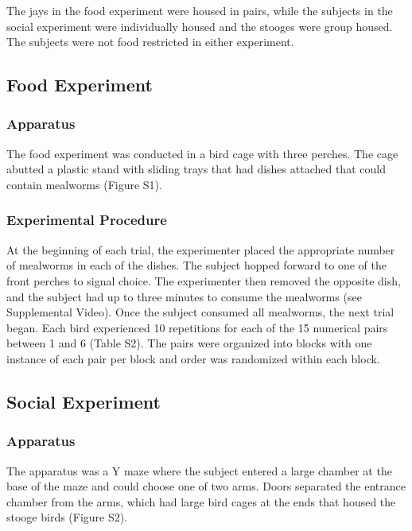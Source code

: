 \documentclass[
  ,pub,floatsintext]{apa6}
\begin{document}
The jays in the food experiment were housed in pairs, while the subjects in the social experiment were individually housed and the stooges were group housed. The subjects were not food restricted in either experiment.

\hypertarget{food-experiment}{%
\subsection{Food Experiment}\label{food-experiment}}

\hypertarget{apparatus}{%
\subsubsection{Apparatus}\label{apparatus}}

The food experiment was conducted in a bird cage with three perches. The cage abutted a plastic stand with sliding trays that had dishes attached that could contain mealworms (Figure S1).

\hypertarget{experimental-procedure}{%
\subsubsection{Experimental Procedure}\label{experimental-procedure}}

At the beginning of each trial, the experimenter placed the appropriate number of mealworms in each of the dishes. The subject hopped forward to one of the front perches to signal choice. The experimenter then removed the opposite dish, and the subject had up to three minutes to consume the mealworms (see Supplemental Video). Once the subject consumed all mealworms, the next trial began.
Each bird experienced 10 repetitions for each of the 15 numerical pairs between 1 and 6 (Table S2). The pairs were organized into blocks with one instance of each pair per block and order was randomized within each block.

\hypertarget{social-experiment}{%
\subsection{Social Experiment}\label{social-experiment}}

\hypertarget{apparatus-1}{%
\subsubsection{Apparatus}\label{apparatus-1}}

The apparatus was a Y maze where the subject entered a large chamber at the base of the maze and could choose one of two arms. Doors separated the entrance chamber from the arms, which had large bird cages at the ends that housed the stooge birds (Figure S2).
\end{document}
